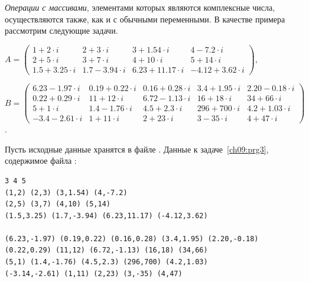 
\emph{Операции с массивами}, элементами которых являются комплексные числа, 
осуществляются также, как и с обычными
переменными. В качестве примера рассмотрим следующие задачи.

{\noindent\scriptsize
$A=\left(\begin{array}{rrrr}1+2\cdot i&2+3\cdot i&3+1.54\cdot i&4-7.2\cdot i\\2+5\cdot i&3+7\cdot i&4+10\cdot i&5+14\cdot
i\\1.5+3.25\cdot i&1.7-3.94\cdot i&6.23+11.17\cdot i&-4.12+3.62\cdot i\end{array}\right)$,

\noindent $B=\left(\begin{array}{rrrrr}6.23-1.97\cdot i&0.19+0.22\cdot i&0.16+0.28\cdot i&3.4+1.95\cdot i&2.20-0.18\cdot
i\\0.22+0.29\cdot i&11+12\cdot i&6.72-1.13\cdot i&16+18\cdot i&34+66\cdot i\\5+1\cdot i&1.4-1.76\cdot i&4.5+2.3\cdot
i&296+700\cdot i&4.2+1.03\cdot i\\-3.4-2.61\cdot i&1+11\cdot i&2+23\cdot i&3-35\cdot i&4+47\cdot i\end{array}\right)$.
}

Пусть исходные данные хранятся в файле . %
Данные к задаче~\ref{ch09:prg3}\label{ch09:file0}, содержимое файла :
\begin{verbatim}
3 4 5
(1,2) (2,3) (3,1.54) (4,-7.2)
(2,5) (3,7) (4,10) (5,14)
(1.5,3.25) (1.7,-3.94) (6.23,11.17) (-4.12,3.62)

(6.23,-1.97) (0.19,0.22) (0.16,0.28) (3.4,1.95) (2.20,-0.18)
(0.22,0.29) (11,12) (6.72,-1.13) (16,18) (34,66)
(5,1) (1.4,-1.76) (4.5,2.3) (296,700) (4.2,1.03)
(-3.14,-2.61) (1,11) (2,23) (3,-35) (4,47)
\end{verbatim}


